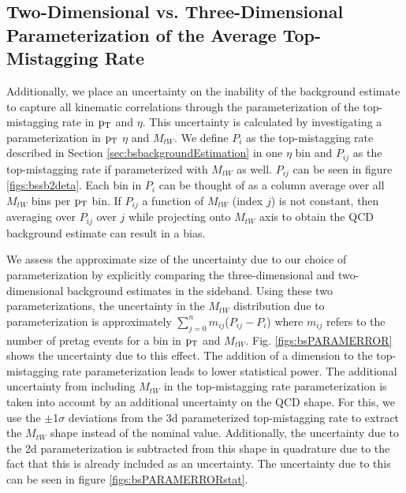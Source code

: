 \subsection{Two-Dimensional  vs. Three-Dimensional Parameterization of the Average Top-Mistagging Rate}
\label{sec:bsparamerrors1}
Additionally, we place an uncertainty on the inability of the
background estimate to capture all kinematic correlations through the
parameterization of the top-mistagging rate in $\mathrm{p_{T}}$ and $\eta$.
This uncertainty is calculated by investigating a parameterization in
$\mathrm{p_{T}}$ $\eta$ and $M_{tW}$.  We define $P_i$ as the top-mistagging
rate described in Section \ref{sec:bsbackgroundEstimation} in one
$\eta$ bin and $P_{ij}$ as the top-mistagging rate if parameterized
with $M_{tW}$ as well.  $P_{ij}$ can be seen in
figure \ref{figs:bssb2deta}.  Each bin in $P_i$ can be thought of as a
column average over all $M_{tW}$ bins per $\mathrm{p_{T}}$ bin.  If $P_{ij}$ a
function of $M_{tW}$ (index $j$) is not constant, then averaging over
$P_{ij}$ over $j$ while projecting onto $M_{tW}$ axis to obtain the
QCD background estimate can result in a bias.  

We assess the approximate size of the uncertainty due to our choice of
parameterization by explicitly comparing the three-dimensional and
two-dimensional background estimates in the sideband.  Using these two
parameterizations, the uncertainty in the $M_{tW}$ distribution due to
parameterization is approximately $\displaystyle\sum\limits_{j=0}^n
m_{ij}$($P_{ij}-P_i$) where $m_{ij}$ refers to the number of pretag
events for a bin in $\mathrm{p_{T}}$ and $M_{tW}$.  Fig. \ref{figs:bsPARAMERROR}
shows the uncertainty due to this effect.  The addition of a dimension to the top-mistagging rate parameterization 
leads to lower statistical power.  The additional uncertainty from including $M_{tW}$ in the top-mistagging rate 
parameterization is taken into account by an additional uncertainty on the QCD shape.  For this, we use the $\pm$1$\sigma$ deviations from the 3d parameterized top-mistagging rate to 
extract the $M_{tW}$ shape instead of the nominal value.  Additionally, the uncertainty due to the 2d parameterization is subtracted from this shape in quadrature due to the fact that this is already included as an uncertainty.  
The uncertainty due to this can be seen in figure \ref{figs:bsPARAMERRORstat}.

